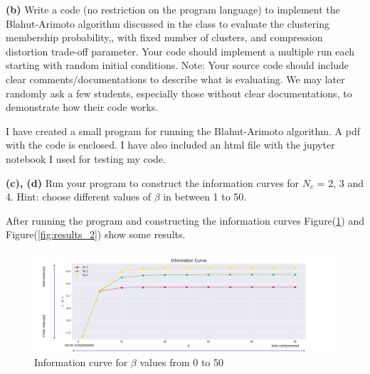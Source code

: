 \documentclass[11pt]{article}
\begin{document}
\begin{tcolorbox}
\textbf{(b)}
Write a code (no restriction on the program language) to implement
the Blahut-Arimoto algorithm discussed in the class to evaluate the clustering
membership probability,, with fixed number of clusters, and compression distortion trade-off parameter. Your code should implement a multiple run each
starting with random initial conditions. Note: Your source code should include clear
comments/documentations to describe what is evaluating. We may later randomly ask
a few students, especially those without clear documentations, to demonstrate how
their code works.
\end{tcolorbox}
I have created a small program for running the Blahut-Arimoto algorithm. A pdf with the code is enclosed.
I have also included an html file with the jupyter notebook I used for testing my code.

\begin{tcolorbox}
\textbf{(c), (d)}
Run your program to construct the information curves for $N_{c}$ = 2, 3 and
4. Hint: choose different values of $\beta$ in between 1 to 50.
\end{tcolorbox}

After running the program and constructing the information curves Figure(\ref{fig:results_1}) and Figure(\ref{fig:results_2}) show some results.

\begin{figure}[h!]
	\hspace*{-1.5in}
	\centering
	\includegraphics[width=220mm,scale=0.5]{beta_range_50.png}
	\caption{Information curve for $\beta$ values from 0 to 50}
	\label{fig:results_1}
\end{figure}
\end{document}
